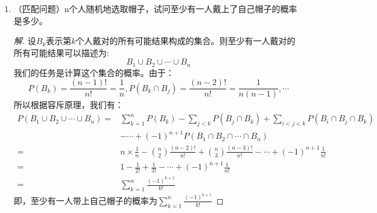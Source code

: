 \documentclass[12pt]{article}
\newcommand{\hei}{\CJKfamily{hei}}                          %
\begin{document}
\begin{enumerate}
\item {\hei （匹配问题）n个人随机地选取帽子，试问至少有一人戴上了自己帽子的概率是多少。}
\begin{proof}[解]
	设$B_k$表示第$k$个人戴对的所有可能结果构成的集合。则至少有一人戴对的所有可能结果可以描述为:
	\begin{equation}
	B_1\cup B_2\cup\cdots\cup B_n
	\end{equation}
	我们的任务是计算这个集合的概率。由于：
	\begin{equation}
	P(B_k)=\frac{(n-1)!}{n!}=\frac{1}{n},P(B_k\cap B_j)=\frac{(n-2)!}{n!}=\frac{1}{n(n-1)},\cdots
	\end{equation}
	所以根据容斥原理，我们有：
	\begin{equation}
	\begin{aligned}
	P(B_1\cup B_2\cup\cdots\cup B_n)=&\sum_{k=1}^{n}P(B_k)-\sum_{j<k}P(B_j\cap B_k)+\sum_{i<j<k}P(B_i\cap B_j\cap B_k) \\
	&-\cdots+(-1)^{n+1}P(B_1\cap B_2\cap \cdots \cap B_n) \\
	=&n\times\frac{1}{n}-\binom{n}{2}\frac{(n-2)!}{n!}+\binom{n}{3}\frac{(n-3)!}{n!}-\cdots+(-1)^{n+1}\frac{1}{n!} \\
	=&1-\frac{1}{2!}+\frac{1}{3!}-\cdots+(-1)^{n+1}\frac{1}{n!} \\
	=&\sum_{k=1}^{n}\frac{(-1)^{k+1}}{k!}
	\end{aligned}
	\end{equation}
	即，至少有一人带上自己帽子的概率为$\sum_{k=1}^{n}\frac{(-1)^{k+1}}{k!}$
\end{proof}


\end{enumerate}
\end{document}
